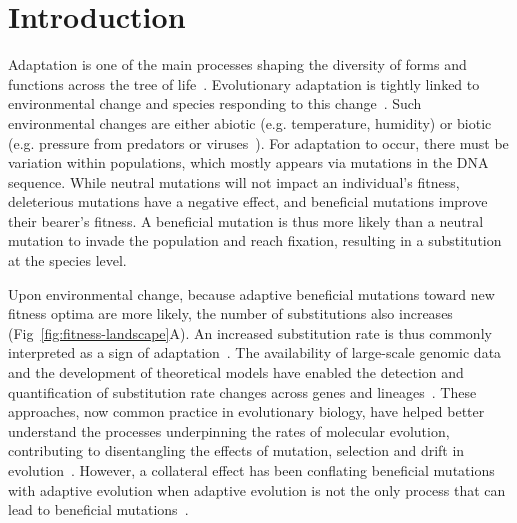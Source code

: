 \documentclass[10pt,letterpaper]{article}
\begin{document}
\linenumbers


\section*{Introduction}
Adaptation is one of the main processes shaping the diversity of forms and functions across the tree of life~\cite{darwin_origin_1859}.
Evolutionary adaptation is tightly linked to environmental change and species responding to this change~\cite{merrell_adaptive_1994, gavrilets_adaptive_2009}.
Such environmental changes are either abiotic (e.g. temperature, humidity) or biotic (e.g. pressure from predators or viruses~\cite{enard_viruses_2016}).
For adaptation to occur, there must be variation within populations, which mostly appears via mutations in the DNA sequence.
While neutral mutations will not impact an individual's fitness, deleterious mutations have a negative effect, and beneficial mutations improve their bearer's fitness.
A beneficial mutation is thus more likely than a neutral mutation to invade the population and reach fixation, resulting in a substitution at the species level.

Upon environmental change, because adaptive beneficial mutations toward new fitness optima are more likely, the number of substitutions also increases (Fig~\ref{fig:fitness-landscape}A).
An increased substitution rate is thus commonly interpreted as a sign of adaptation~\cite{mcdonald_adaptative_1991, smith_adaptive_2002, welch_estimating_2006}.
The availability of large-scale genomic data and the development of theoretical models have enabled the detection and quantification of substitution rate changes across genes and lineages~\cite{yang_statistical_2000, eyre-walker_genomic_2006, moutinho_variation_2019}.
These approaches, now common practice in evolutionary biology, have helped better understand the processes underpinning the rates of molecular evolution, contributing to disentangling the effects of mutation, selection and drift in evolution~\cite{lynch_mutation_2023}.
However, a collateral effect has been conflating beneficial mutations with adaptive evolution when adaptive evolution is not the only process that can lead to beneficial mutations~\cite{charlesworth_other_2007, mustonen_fitness_2009, jones_shifting_2017}.
\end{document}

